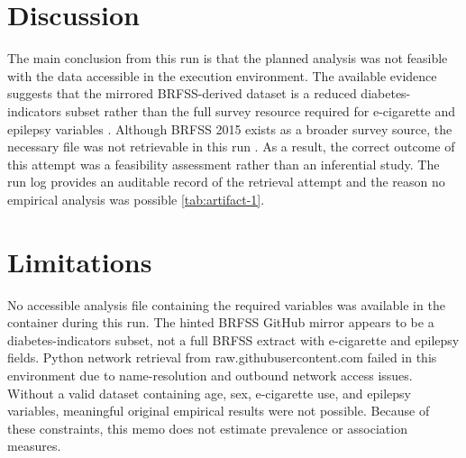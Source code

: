 \documentclass[11pt]{article}
\begin{document}
\section{Discussion}
The main conclusion from this run is that the planned analysis was not feasible with the data accessible in the execution environment. The available evidence suggests that the mirrored BRFSS-derived dataset is a reduced diabetes-indicators subset rather than the full survey resource required for e-cigarette and epilepsy variables \cite{ref1}. Although BRFSS 2015 exists as a broader survey source, the necessary file was not retrievable in this run \cite{ref2}. As a result, the correct outcome of this attempt was a feasibility assessment rather than an inferential study. The run log provides an auditable record of the retrieval attempt and the reason no empirical analysis was possible \ref{tab:artifact-1}.

\section{Limitations}
No accessible analysis file containing the required variables was available in the container during this run. The hinted BRFSS GitHub mirror appears to be a diabetes-indicators subset, not a full BRFSS extract with e-cigarette and epilepsy fields. Python network retrieval from raw.githubusercontent.com failed in this environment due to name-resolution and outbound network access issues. Without a valid dataset containing age, sex, e-cigarette use, and epilepsy variables, meaningful original empirical results were not possible. Because of these constraints, this memo does not estimate prevalence or association measures.



\end{document}
